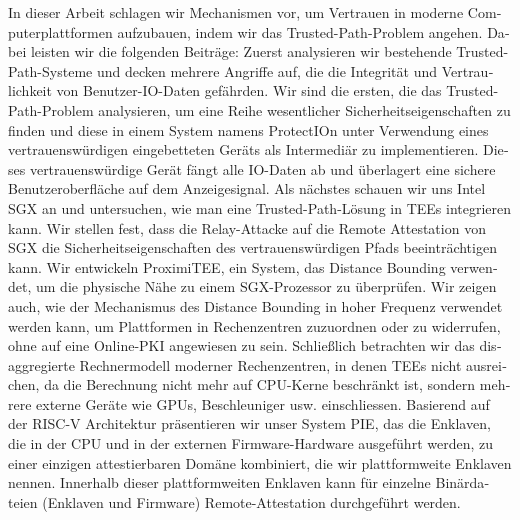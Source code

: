 \begin{otherlanguage}{ngerman}
In dieser Arbeit schlagen wir Mechanismen vor, um Vertrauen in moderne Computerplattformen aufzubauen, indem wir das Trusted-Path-Problem angehen. Dabei leisten wir die folgenden Beitr\"age: Zuerst analysieren wir bestehende Trusted-Path-Systeme und decken mehrere Angriffe auf, die die Integrit\"at und Vertraulichkeit von Benutzer-IO-Daten gef\"ahrden. Wir sind die ersten, die das Trusted-Path-Problem analysieren, um eine Reihe wesentlicher Sicherheitseigenschaften zu finden und diese in einem System namens ProtectIOn unter Verwendung eines vertrauensw\"urdigen eingebetteten Ger\"ats als Intermedi\"ar zu implementieren. Dieses vertrauensw\"urdige Ger\"at f\"angt alle IO-Daten ab und \"uberlagert eine sichere Benutzeroberfl\"ache auf dem Anzeigesignal. Als n\"achstes schauen wir uns Intel SGX an und untersuchen, wie man eine Trusted-Path-L\"osung in TEEs integrieren kann. Wir stellen fest, dass die Relay-Attacke auf die Remote Attestation von SGX die Sicherheitseigenschaften des vertrauensw\"urdigen Pfads beeintr\"achtigen kann. Wir entwickeln ProximiTEE, ein System, das Distance Bounding verwendet, um die physische N\"ahe zu einem SGX-Prozessor zu \"uberpr\"ufen. Wir zeigen auch, wie der Mechanismus des Distance Bounding in hoher Frequenz verwendet werden kann, um Plattformen in Rechenzentren zuzuordnen oder zu widerrufen, ohne auf eine Online-PKI angewiesen zu sein. Schlie{\ss}lich betrachten wir das disaggregierte Rechnermodell moderner Rechenzentren, in denen TEEs nicht ausreichen, da die Berechnung nicht mehr auf CPU-Kerne beschr\"ankt ist, sondern mehrere externe Ger\"ate wie GPUs, Beschleuniger usw. einschliessen. Basierend auf der RISC-V Architektur pr\"asentieren wir unser System PIE, das die Enklaven, die in der CPU und in der externen Firmware-Hardware ausgef\"uhrt werden, zu einer einzigen attestierbaren Dom\"ane kombiniert, die wir plattformweite Enklaven nennen. Innerhalb dieser plattformweiten Enklaven kann f\"ur einzelne Bin\"ardateien (Enklaven und Firmware) Remote-Attestation durchgef\"uhrt werden.


\end{otherlanguage}

\endgroup

\vfill